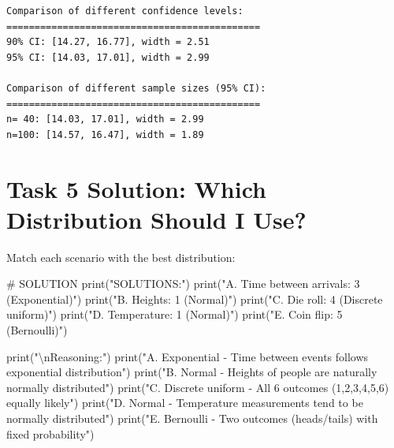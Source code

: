 \documentclass[
  letterpaper,
  DIV=11,
  numbers=noendperiod]{scrartcl}
\newenvironment{Shaded}{\begin{snugshade}}{\end{snugshade}}
\newcommand{\BuiltInTok}[1]{\textcolor[rgb]{0.00,0.23,0.31}{#1}}
\newcommand{\CharTok}[1]{\textcolor[rgb]{0.13,0.47,0.30}{#1}}
\newcommand{\CommentTok}[1]{\textcolor[rgb]{0.37,0.37,0.37}{#1}}
\newcommand{\NormalTok}[1]{\textcolor[rgb]{0.00,0.23,0.31}{#1}}
\newcommand{\StringTok}[1]{\textcolor[rgb]{0.13,0.47,0.30}{#1}}
\begin{document}
\begin{verbatim}
Comparison of different confidence levels:
=============================================
90% CI: [14.27, 16.77], width = 2.51
95% CI: [14.03, 17.01], width = 2.99

Comparison of different sample sizes (95% CI):
=============================================
n= 40: [14.03, 17.01], width = 2.99
n=100: [14.57, 16.47], width = 1.89
\end{verbatim}

\section{Task 5 Solution: Which Distribution Should I
Use?}\label{task-5-solution-which-distribution-should-i-use}

Match each scenario with the best distribution:

\begin{Shaded}
\begin{Highlighting}[]
\CommentTok{\# SOLUTION}
\BuiltInTok{print}\NormalTok{(}\StringTok{"SOLUTIONS:"}\NormalTok{)}
\BuiltInTok{print}\NormalTok{(}\StringTok{"A. Time between arrivals: 3 (Exponential)"}\NormalTok{)      }
\BuiltInTok{print}\NormalTok{(}\StringTok{"B. Heights: 1 (Normal)"}\NormalTok{)                    }
\BuiltInTok{print}\NormalTok{(}\StringTok{"C. Die roll: 4 (Discrete uniform)"}\NormalTok{)                   }
\BuiltInTok{print}\NormalTok{(}\StringTok{"D. Temperature: 1 (Normal)"}\NormalTok{)                }
\BuiltInTok{print}\NormalTok{(}\StringTok{"E. Coin flip: 5 (Bernoulli)"}\NormalTok{)                  }

\BuiltInTok{print}\NormalTok{(}\StringTok{"}\CharTok{\textbackslash{}n}\StringTok{Reasoning:"}\NormalTok{)}
\BuiltInTok{print}\NormalTok{(}\StringTok{"A. Exponential {-} Time between events follows exponential distribution"}\NormalTok{)}
\BuiltInTok{print}\NormalTok{(}\StringTok{"B. Normal {-} Heights of people are naturally normally distributed"}\NormalTok{)  }
\BuiltInTok{print}\NormalTok{(}\StringTok{"C. Discrete uniform {-} All 6 outcomes (1,2,3,4,5,6) equally likely"}\NormalTok{)}
\BuiltInTok{print}\NormalTok{(}\StringTok{"D. Normal {-} Temperature measurements tend to be normally distributed"}\NormalTok{)}
\BuiltInTok{print}\NormalTok{(}\StringTok{"E. Bernoulli {-} Two outcomes (heads/tails) with fixed probability"}\NormalTok{)}
\end{Highlighting}
\end{Shaded}
\end{document}
